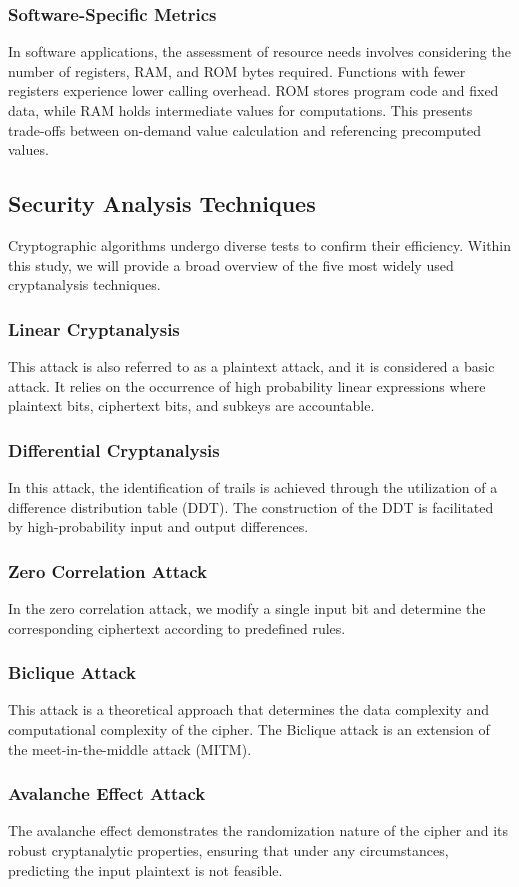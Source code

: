 \documentclass[conference,compsoc]{IEEEtran}
\begin{document}
\subsubsection{Software-Specific Metrics} 
In software applications, the assessment of resource needs involves considering the number of registers, RAM, and ROM bytes required. Functions with fewer registers experience lower calling overhead. ROM stores program code and fixed data, while RAM holds intermediate values for computations. This presents trade-offs between on-demand value calculation and referencing precomputed values.
\subsection{Security Analysis Techniques}
Cryptographic algorithms undergo diverse tests to confirm their efficiency. Within this study, we will provide a broad overview of the five most widely used cryptanalysis techniques.
\subsubsection{Linear Cryptanalysis} 
This attack is also referred to as a plaintext attack, and it is considered a basic attack. It relies on the occurrence of high probability linear expressions where plaintext bits, ciphertext bits, and subkeys are accountable.
\subsubsection{Differential Cryptanalysis} 
In this attack, the identification of trails is achieved through the utilization of a difference distribution table (DDT). The construction of the DDT is facilitated by high-probability input and output differences.
\subsubsection{Zero Correlation Attack} 
In the zero correlation attack, we modify a single input bit and determine the corresponding ciphertext according to predefined rules.
\subsubsection{Biclique Attack} 
This attack is a theoretical approach that determines the data complexity and computational complexity of the cipher. The Biclique attack is an extension of the meet-in-the-middle attack (MITM).
\subsubsection{Avalanche Effect Attack} 
The avalanche effect demonstrates the randomization nature of the cipher and its robust cryptanalytic properties, ensuring that under any circumstances, predicting the input plaintext is not feasible.
\end{document}
